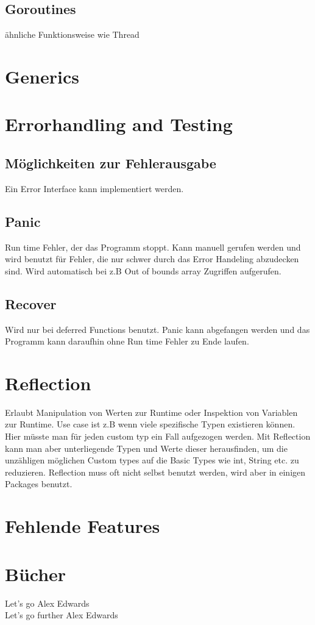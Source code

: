 \subsection{Goroutines}
ähnliche Funktionsweise wie Thread

\section{Generics}

\section{Errorhandling and Testing}
\subsection{Möglichkeiten zur Fehlerausgabe}
Ein Error Interface kann implementiert werden.
\subsection{Panic}
Run time Fehler, der das Programm stoppt. Kann manuell gerufen werden und wird benutzt für Fehler, die nur schwer durch das Error Handeling abzudecken sind. Wird automatisch bei z.B Out of bounds array Zugriffen aufgerufen.
\subsection{Recover}
Wird nur bei deferred Functions benutzt. Panic kann abgefangen werden und das Programm kann daraufhin ohne Run time Fehler zu Ende laufen.

\section{Reflection}
Erlaubt Manipulation von Werten zur Runtime oder Inspektion von Variablen zur Runtime. Use case ist z.B wenn viele spezifische Typen existieren können. Hier müsste man für jeden custom typ ein Fall aufgezogen werden. Mit Reflection kann man aber unterliegende Typen und Werte dieser herausfinden, um die unzähligen möglichen Custom types auf die Basic Types wie int, String etc. zu reduzieren.
Reflection muss oft nicht selbst benutzt werden, wird aber in einigen Packages benutzt.

\section{Fehlende Features}

\section{Bücher}
Let's go Alex Edwards\\ 
Let's go further Alex Edwards\\
